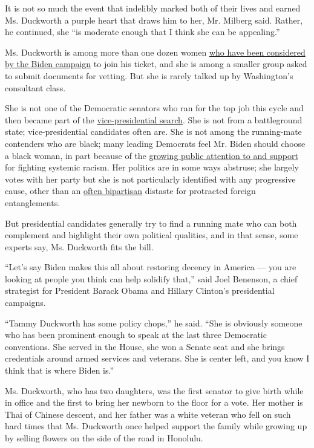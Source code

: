 It is not so much the event that indelibly marked both of their lives
and earned Ms. Duckworth a purple heart that draws him to her, Mr.
Milberg said. Rather, he continued, she ``is moderate enough that I
think she can be appealing.''

Ms. Duckworth is among more than one dozen women
\href{https://www.nytimes.com/article/biden-vice-president-2020.html}{who
have been considered by the Biden campaign} to join his ticket, and she
is among a smaller group asked to submit documents for vetting. But she
is rarely talked up by Washington's consultant class.

She is not one of the Democratic senators who ran for the top job this
cycle and then became part of the
\href{https://www.nytimes.com/2020/06/26/us/politics/biden-vice-president-voters.html}{vice-presidential
search}. She is not from a battleground state; vice-presidential
candidates often are. She is not among the running-mate contenders who
are black; many leading Democrats feel Mr. Biden should choose a black
woman, in part because of the
\href{https://www.nytimes.com/2020/06/05/us/politics/polling-george-floyd-protests-racism.html}{growing
public attention to and support} for fighting systemic racism. Her
politics are in some ways abstruse; she largely votes with her party but
she is not particularly identified with any progressive cause, other
than an
\href{https://www.nytimes.com/2019/03/16/us/politics/vote-vets-concerned-veterans-america.html}{often
bipartisan} distaste for protracted foreign entanglements.

But presidential candidates generally try to find a running mate who can
both complement and highlight their own political qualities, and in that
sense, some experts say, Ms. Duckworth fits the bill.

``Let's say Biden makes this all about restoring decency in America ---
you are looking at people you think can help solidify that,'' said Joel
Benenson, a chief strategist for President Barack Obama and Hillary
Clinton's presidential campaigns.

``Tammy Duckworth has some policy chops,'' he said. ``She is obviously
someone who has been prominent enough to speak at the last three
Democratic conventions. She served in the House, she won a Senate seat
and she brings credentials around armed services and veterans. She is
center left, and you know I think that is where Biden is.''

Ms. Duckworth, who has two daughters, was the first senator to give
birth while in office and the first to bring her newborn to the floor
for a vote. Her mother is Thai of Chinese descent, and her father was a
white veteran who fell on such hard times that Ms. Duckworth once helped
support the family while growing up by selling flowers on the side of
the road in Honolulu.

